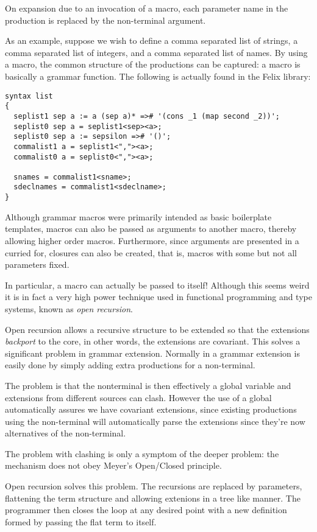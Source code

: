 \documentclass[oneside]{book}
\begin{document}
On expansion due to an invocation of a macro, each parameter
name in the production is replaced by the non-terminal argument.

As an example, suppose we wish to define a comma separated list
of strings, a comma separated list of integers, and a comma 
separated list of names. By using a macro, the common structure
of the productions can be captured: a macro is basically 
a grammar function. The following is actually found in the
Felix library: 

\begin{verbatim}
syntax list 
{
  seplist1 sep a := a (sep a)* =># '(cons _1 (map second _2))'; 
  seplist0 sep a = seplist1<sep><a>;
  seplist0 sep a := sepsilon =># '()';
  commalist1 a = seplist1<","><a>;
  commalist0 a = seplist0<","><a>;

  snames = commalist1<sname>;
  sdeclnames = commalist1<sdeclname>;
}
\end{verbatim}

Although grammar macros were primarily intended as basic boilerplate
templates, macros can also be passed as arguments to another macro,
thereby allowing higher order macros. Furthermore, since arguments
are presented in a curried for, closures can also be created,
that is, macros with some but not all parameters fixed.

In particular, a macro can actually be passed to itself!
Although this seems weird it is in fact a very high power
technique used in functional programming and type systems,
known as {\em open recursion}.

Open recursion allows a recursive structure to be extended
so that the extensions {\em backport} to the core, in other
words, the extensions are covariant. This solves a significant
problem in grammar extension. Normally in a grammar extension
is easily done by simply adding extra productions for a non-terminal.

The problem is that the nonterminal is then effectively a global 
variable and extensions from different sources can clash. However
the use of a global automatically assures we have covariant extensions,
since existing productions using the non-terminal will automatically
parse the extensions since they're now alternatives of the non-terminal.

The problem with clashing is only a symptom of the deeper problem:
the mechanism does not obey Meyer's Open/Closed principle.

Open recursion solves this problem. The recursions are replaced
by parameters, flattening the term structure and allowing
extenions in a tree like manner. The programmer then closes
the loop at any desired point with a new definition formed by
passing the flat term to itself. 
\end{document}
